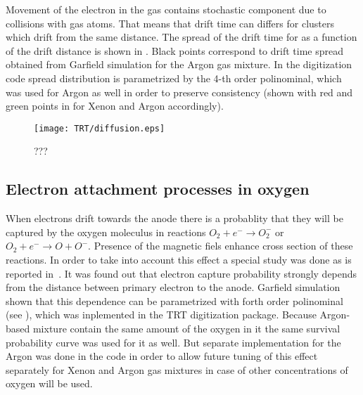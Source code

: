 
Movement of the electron in the gas contains stochastic component due to collisions with gas atoms. 
That means that drift time can differs for clusters which drift from the same distance.
The spread of the drift time for as a function of the drift distance is shown in .
Black points correspond to drift time spread obtained from Garfield simulation for the Argon gas mixture.
In the digitization code spread distribution is parametrized by the 4-th order polinominal, which was used for Argon as well
in order to preserve consistency (shown with red and green points in  for Xenon and Argon accordingly).

\begin{figure}
\begin{center}
\texttt{[image: TRT/diffusion.eps]}
\caption{???}
\label{fig:diffusion}
\end{center}
\end{figure}


\subsection{Electron attachment processes in oxygen}
\label{subsec:recapture}
When electrons drift towards the anode there is a probablity that they will be captured by the oxygen moleculus in reactions
$O_2 + e^- \to O_2^-$ or $O_2 + e^- \to O + O^-$. Presence of the magnetic fiels enhance cross section of these reactions.
In order to take into account this effect a special study was done as is reported in~\cite{esben_thesis}.
It was found out that electron capture probability strongly depends from the distance between primary electron to the anode.
Garfield simulation shown that this dependence can be parametrized with forth order polinominal (see ), 
which was inplemented in the TRT digitization package. 
Because Argon-based mixture contain the same amount of the oxygen in it the same survival probability
curve was used for it as well. But separate implementation for the Argon was done in the code in order to allow future tuning of this effect separately for Xenon and Argon gas mixtures
in case of other concentrations of oxygen will be used.

